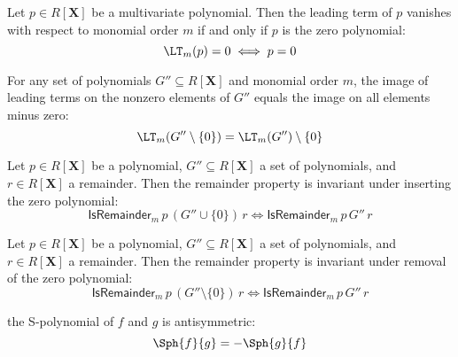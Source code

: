 \begin{lemma}\label{lm_eq_zero_iff}
  \leanok
  Let $p \in R[\mathbf{X}]$ be a multivariate polynomial. Then the leading term of $p$
vanishes with respect to monomial order $m$ if and only if $p$ is the zero polynomial:
\[
\LT_m(p) = 0 \iff p = 0
\]
\end{lemma}

\begin{lemma}\label{leadingTerm_image_sdiff_singleton_zero}
  \leanok
  For any set of polynomials $G'' \subseteq R[\mathbf{X}]$ and monomial order $m$,
the image of leading terms on the nonzero elements of $G''$ equals the image on all
elements minus zero:
\[
\LT_m(G'' \setminus \{0\}) = \LT_m(G'') \setminus \{0\}
\]

\end{lemma}

\begin{lemma}\label{isRemainder_of_insert_zero_iff_isRemainder}
  \leanok
  Let $p \in R[\mathbf{X}]$ be a polynomial, $G'' \subseteq R[\mathbf{X}]$ a set of polynomials,
and $r \in R[\mathbf{X}]$ a remainder. Then the remainder property is invariant under
inserting the zero polynomial:
\[
\mathsf{IsRemainder}_m\,p\,(G'' \cup \{0\})\,r \iff \mathsf{IsRemainder}_m\,p\,G''\,r
\]

\end{lemma}

\begin{lemma}\label{isRemainder_of_singleton_zero_iff_isRemainder}
  \leanok
  Let $p \in R[\mathbf{X}]$ be a polynomial, $G'' \subseteq R[\mathbf{X}]$ a set of polynomials,
and $r \in R[\mathbf{X}]$ a remainder. Then the remainder property is invariant under
removal of the zero polynomial:
\[
\mathsf{IsRemainder}_m\,p\,(G'' \setminus \{0\})\,r \iff \mathsf{IsRemainder}_m\,p\,G''\,r
\]

\end{lemma}

\begin{lemma}\label{sPolynomial_antisymm}
  \leanok
  the S-polynomial of $f$ and $g$ is antisymmetric:
\[
\Sph{f}{g} = -\Sph{g}{f}
\]
\end{lemma}

